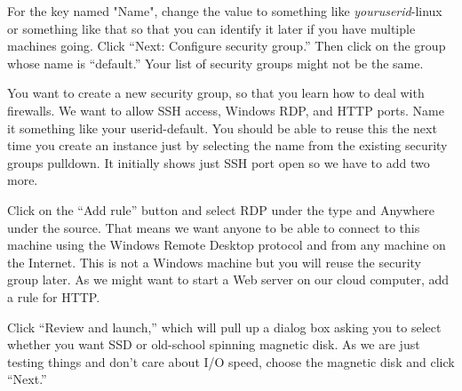 \begin{fullwidth}
\step For the key named "Name", change the value to something like {\em youruserid}-linux or something like that so that you can identify it later if you have multiple machines going. Click ``Next: Configure security group.'' Then click on the group whose name is ``default.'' Your list of security groups might not be the same.


\step You want to create a new security group, so that you learn how to deal with firewalls. We want to allow SSH access, Windows RDP, and HTTP ports.   Name it something like your userid-default. You should be able to reuse this the next time you create an instance just by selecting the name from the existing security groups pulldown. It initially shows just SSH port open so we have to add two more. 


\step Click on the ``Add rule'' button and select RDP under the type and Anywhere under the source. That means we want anyone to be able to connect to this machine using the Windows Remote Desktop protocol and from any machine on the Internet. This is not a Windows machine but you will reuse the security group later. As we might want to start a Web server on our cloud computer, add a rule for HTTP.


\step Click ``Review and launch,'' which will pull up a dialog box asking you to select whether you want SSD or old-school spinning magnetic disk. As we are just testing things and don't care about I/O speed, choose the magnetic disk and click ``Next.''



\end{fullwidth}
